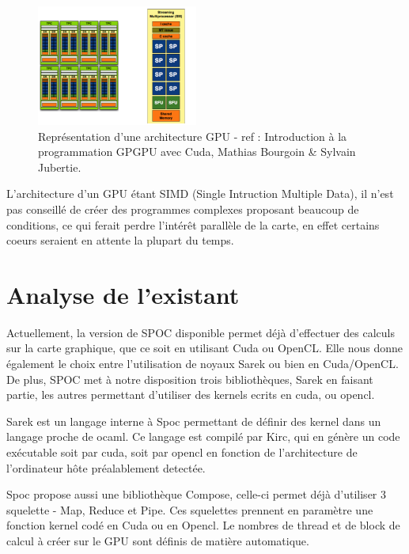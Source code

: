 \documentclass{report}
\begin{document}
\begin{figure}[!h]
\begin{center}
\includegraphics[height=150]{image2.png}
\end{center}
\caption{Représentation d’une architecture GPU - ref : Introduction à la programmation GPGPU avec Cuda, Mathias Bourgoin & Sylvain Jubertie.}
\label{test}
\end{figure} \newline

L’architecture d’un GPU étant SIMD (Single Intruction Multiple Data), il n’est pas conseillé de créer des programmes complexes proposant beaucoup de conditions, ce qui ferait perdre l'intérêt parallèle de la carte, en effet certains coeurs seraient en attente la plupart du temps. 

\section{Analyse de l'existant}
Actuellement, la version de SPOC disponible permet déjà d’effectuer des calculs sur la carte graphique, que ce soit en utilisant Cuda ou OpenCL. Elle nous donne également le choix entre l’utilisation de noyaux Sarek ou bien en Cuda/OpenCL. De plus, SPOC met à notre disposition trois bibliothèques, Sarek en faisant partie, les autres permettant d’utiliser des kernels ecrits en cuda, ou opencl.\newline

Sarek est un langage interne à Spoc permettant de définir des kernel dans un langage proche de ocaml. Ce langage est compilé par Kirc, qui en génère un code exécutable soit par cuda, soit par opencl en fonction de l’architecture de l’ordinateur hôte préalablement detectée.

Spoc propose aussi une bibliothèque Compose, celle-ci permet déjà d’utiliser 3 squelette - Map, Reduce et Pipe. Ces squelettes prennent en paramètre une fonction kernel codé en Cuda ou en Opencl. Le nombres de thread et de block de calcul à créer sur le GPU sont définis de matière automatique. 
  
\end{document}
